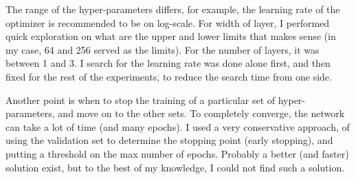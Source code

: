 \par The range of the hyper-parameters differs, for example, the learning rate of the optimizer is recommended to be on log-scale. For width of layer, I performed quick exploration on what are the upper and lower limits that makes sense (in my case, 64 and 256 served as the limits). For the number of layers, it was between 1 and 3. I search for the learning rate was done alone first, and then fixed for the rest of the experiments, to reduce the search time from one side.

\par Another point is when to stop the training of a particular set of hyper-parameters, and move on to the other sets. To completely converge, the network can take a lot of time (and many epochs). I used a very conservative approach, of using the validation set to determine the stopping point (early stopping), and putting a threshold on the max number of epochs. Probably a better (and faster) solution exist, but to the best of my knowledge, I could not find such a solution.
